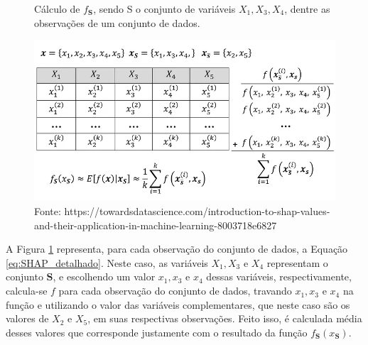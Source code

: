 \begin{figure}[H]
    \centering
    \caption{Cálculo de $f_{\textbf{S}}$, sendo S o conjunto de variáveis $X_1, X_3, X_4$, dentre as observações de um conjunto de dados.}
    \includegraphics[scale=0.5]{imagens/shap_explicado.png}
    \caption*{Fonte: https://towardsdatascience.com/introduction-to-shap-values-and-their-application-in-machine-learning-8003718e6827}
    \label{fig:calculo_esforço}

    
\end{figure}
A Figura \ref{fig:calculo_esforço} representa, para cada observação do conjunto de dados, a Equação \ref{eq:SHAP_detalhado}. Neste caso, as variáveis $X_1, X_3$ e $ X_4$ representam o conjunto $\textbf{S}$, e escolhendo um valor $x_1, x_3$ e $ x_4$ dessas variáveis, respectivamente, calcula-se $f$ para cada observação do conjunto de dados, travando $x_1, x_3$ e $ x_4$ na função e utilizando o valor das variáveis complementares, que neste caso são os valores de $X_2$ e $X_5$, em suas respectivas observações. Feito isso, é calculada média desses valores que corresponde justamente com o resultado da função $f_{\textbf{S}}(x_{\textbf{S}})$.